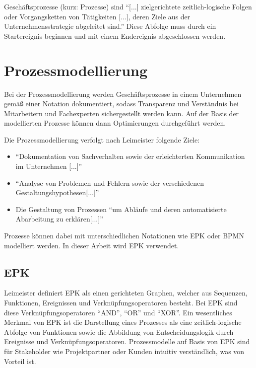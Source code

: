 Geschäftsprozesse (kurz: Prozesse) sind ``[...] zielgerichtete zeitlich-logische Folgen oder Vorgangsketten von Tätigkeiten [...], deren Ziele aus der 
Unternehmensstrategie abgeleitet sind.'' \cite{stahlknecht_einfuhrung_2005} Diese Abfolge muss durch ein Startereignis beginnen und mit einem Endereignis 
abgeschlossen werden. \cite{leimeister_einfuhrung_2015} 

\section{Prozessmodellierung}

Bei der Prozessmodellierung werden Geschäftsprozesse in einem Unternehmen gemäß einer Notation dokumentiert, sodass Transparenz und Verständnis 
bei Mitarbeitern und Fachexperten sichergestellt werden kann. Auf der Basis der modellierten Prozesse können dann Optimierungen durchgeführt werden. \cite{rump_geschaftsprozesmanagement_1999}

\noindent Die Prozessmodellierung verfolgt nach Leimeister folgende Ziele: 

\begin{itemize}
    \item ``Dokumentation von Sachverhalten sowie der erleichterten Kommunikation im Unternehmen [...]'' \cite{leimeister_einfuhrung_2015}
    \item ``Analyse von Problemen und Fehlern sowie der verschiedenen Gestaltungshypothesen[...]'' \cite{leimeister_einfuhrung_2015}
    \item Die Gestaltung von Prozessen ``um Abläufe und deren automatisierte Abarbeitung zu erklären[...]'' \cite{leimeister_einfuhrung_2015}
\end{itemize}


\noindent Prozesse können dabei mit unterschiedlichen Notationen wie \ac{EPK} oder \ac{BPMN} modelliert werden. \cite{leimeister_einfuhrung_2015} In dieser Arbeit wird EPK verwendet.

\subsection{EPK}
\label{epk-definition}

Leimeister definiert \ac{EPK} als einen gerichteten Graphen, welcher aus Sequenzen, Funktionen, Ereignissen und
Verknüpfungsoperatoren besteht. \cite{leimeister_einfuhrung_2015} Bei EPK sind diese Verknüpfungsoperatoren ``AND'', ``OR'' und ``XOR''. \cite{nuttgens_geschaftsprozesmodellierung_1998}
Ein wesentliches Merkmal von EPK ist die Darstellung eines Prozesses als eine zeitlich-logische Abfolge von Funktionen sowie die Abbildung von Entscheidungslogik durch
Ereignisse und Verknüpfungsoperatoren. \cite{nuttgens_geschaftsprozesmodellierung_1998}
Prozessmodelle auf Basis von EPK sind für Stakeholder wie Projektpartner oder Kunden intuitiv verständlich, was von Vorteil ist. \cite{langner_ereignisgesteuerte_1997} 

